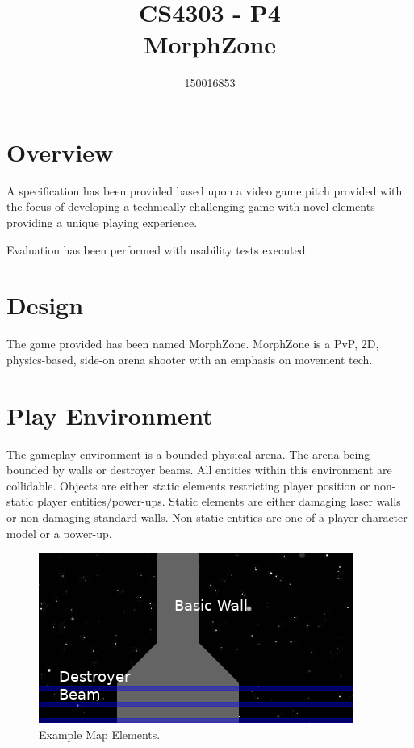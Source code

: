 \documentclass[10pt,a4paper]{article}
\author{150016853}
\title{%
CS4303 - P4\\
MorphZone}
\begin{document}
\maketitle

\section{Overview}

A specification has been provided based upon a video game pitch provided with the focus of developing a technically challenging game with novel elements providing a unique playing experience.

Evaluation has been performed with usability tests executed.

\section{Design}

The game provided has been named MorphZone. MorphZone is a PvP, 2D, physics-based, side-on arena shooter with an emphasis on movement tech.

\section{Play Environment}

The gameplay environment is a bounded physical arena. The arena being bounded by walls or destroyer beams. All entities within this environment are collidable. Objects are either static elements restricting player position or non-static player entities/power-ups. Static elements are either damaging laser walls or non-damaging standard walls. Non-static entities are one of a player character model or a power-up.


\begin{figure}[!h]
\centering
  \includegraphics[width=\linewidth]{map_elements.png}
  \caption{Example Map Elements.}
  \label{fig:boat1}
\end{figure}
\end{document}
